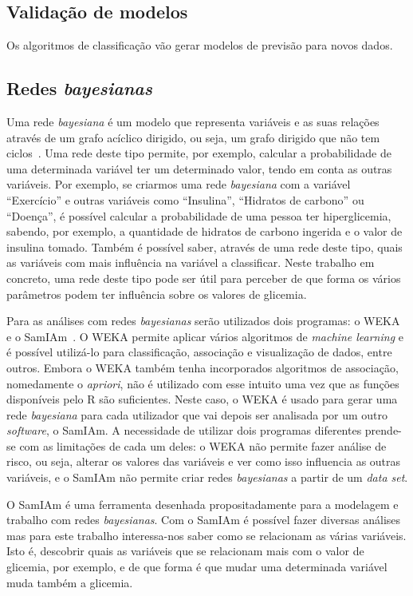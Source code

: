 \subsection{Validação de modelos}

Os algoritmos de classificação vão gerar modelos de previsão para novos dados. 

\subsection{Redes \textit{bayesianas}}
Uma rede \textit{bayesiana} é um modelo que representa variáveis e as suas relações através de um grafo acíclico dirigido, ou seja, um grafo dirigido que não tem ciclos~\cite{bayes}. Uma rede deste tipo permite, por exemplo, calcular a probabilidade de uma determinada variável ter um determinado valor, tendo em conta as outras variáveis. Por exemplo, se criarmos uma rede \textit{bayesiana} com a variável ``Exercício'' e outras variáveis como ``Insulina'', ``Hidratos de carbono'' ou ``Doença'', é possível calcular a probabilidade de uma pessoa ter hiperglicemia, sabendo, por exemplo, a quantidade de hidratos de carbono ingerida e o valor de insulina tomado. Também é possível saber, através de uma rede deste tipo, quais as variáveis com mais influência na variável a classificar. Neste trabalho em concreto, uma rede deste tipo pode ser útil para perceber de que forma os vários parâmetros podem ter influência sobre os valores de glicemia.

Para as análises com redes \textit{bayesianas} serão utilizados dois programas: o \ac{WEKA}~\cite{weka} e o \ac{SamIAm}~\cite{samiam}.
O \ac{WEKA} permite aplicar vários algoritmos de \textit{machine learning} e é possível utilizá-lo para classificação, associação e visualização de dados, entre outros. Embora o \ac{WEKA} também tenha incorporados algoritmos de associação, nomedamente o \textit{apriori}, não é utilizado com esse intuito uma vez que as funções disponíveis pelo R são suficientes. Neste caso, o \ac{WEKA} é usado para gerar uma rede \textit{bayesiana} para cada utilizador que vai depois ser analisada por um outro \textit{software}, o \ac{SamIAm}. A necessidade de utilizar dois programas diferentes prende-se com as limitações de cada um deles: o \ac{WEKA} não permite fazer análise de risco, ou seja, alterar os valores das variáveis e ver como isso influencia as outras variáveis, e o \ac{SamIAm} não permite criar redes \textit{bayesianas} a partir de um \textit{data set}.

O \ac{SamIAm} é uma ferramenta desenhada propositadamente para a modelagem e trabalho com redes \textit{bayesianas}. Com o \ac{SamIAm} é possível fazer diversas análises mas para este trabalho interessa-nos saber como se relacionam as várias variáveis. Isto é, descobrir quais as variáveis que se relacionam mais com o valor de glicemia, por exemplo, e de que forma é que mudar uma determinada variável muda também a glicemia.

